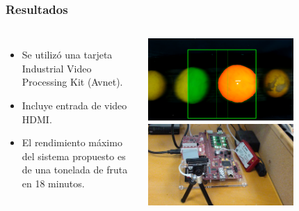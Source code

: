 \frame
{
\frametitle{Resultados}
\begin{columns}
    \begin{itemize}
        \item Se utilizó una tarjeta Industrial Video Processing Kit (Avnet).
        \item Incluye entrada de video HDMI.
        \item El rendimiento máximo del sistema propuesto es de una tonelada de fruta en 18 minutos.
    \end{itemize}         
 \begin{center}
    \includegraphics[width=0.7\textwidth]{Figs/2019_Naranjas_Segmentation1}\\
    \includegraphics[width=0.7\textwidth]{Figs/2019_Naranjas_Industrial_Video_Processing_Kit}
   \end{center}
\end{columns}
}

